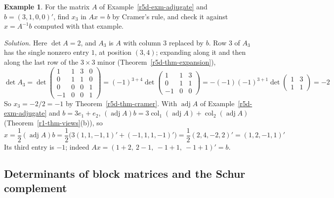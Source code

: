 \documentclass[12pt]{article}
\DeclareMathOperator{\col}{col}
\theoremstyle{definition}
\newtheorem{example}[theorem]{Example}
\begin{document}
\begin{example}\label{r5d-exm-cramer}
For the matrix \(A\) of Example~\ref{r5d-exm-adjugate} and \(b=(3,1,0,0)'\), find \(x_3\) in \(Ax=b\) by
Cramer's rule, and check it against \(x=A^{-1}b\) computed with that example.

\textit{Solution.} Here \(\det A=2\), and \(A_3\) is \(A\) with column \(3\) replaced by \(b\). Row \(3\) of \(A_3\)
has the single nonzero entry \(1\), at position \((3,4)\); expanding along it and then along the last row of the
\(3\times3\) minor (Theorem~\ref{r5d-thm-expansion}),
\[
\det A_3=\det\begin{pmatrix}1&1&3&0\\0&1&1&0\\0&0&0&1\\-1&0&0&1\end{pmatrix}
=(-1)^{3+4}\det\begin{pmatrix}1&1&3\\0&1&1\\-1&0&0\end{pmatrix}
=-(-1)(-1)^{3+1}\det\begin{pmatrix}1&3\\1&1\end{pmatrix}=-2
\]
So \(x_3=-2/2=-1\) by Theorem~\ref{r5d-thm-cramer}. With \(\operatorname{adj}A\) of
Example~\ref{r5d-exm-adjugate} and \(b=3e_1+e_2\), \((\operatorname{adj}A)b=3\col_1(\operatorname{adj}A)+\col_2(\operatorname{adj}A)\)
(Theorem~\ref{r1-thm-views}(b)), so
\[
x=\frac12(\operatorname{adj}A)b=\frac12\bigl(3(1,1,-1,1)'+(-1,1,1,-1)'\bigr)=\frac12(2,4,-2,2)'=(1,2,-1,1)'
\]
Its third entry is \(-1\); indeed \(Ax=(1+2,\ 2-1,\ -1+1,\ -1+1)'=b\).
\end{example}

\subsection*{Determinants of block matrices and the Schur complement}
\end{document}
